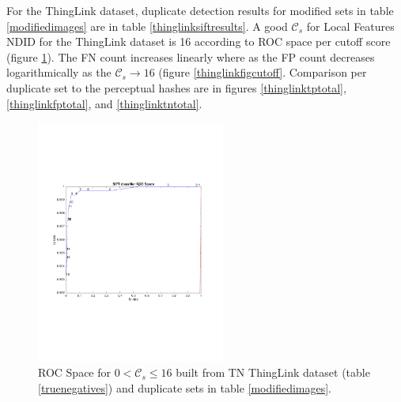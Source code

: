 \documentclass[english,12pt,a4paper,pdftex,elec,utf8]{aaltothesis}
\begin{document}
\clearpage

For the ThingLink dataset, duplicate detection results for modified sets in table \ref{modifiedimages} are in table \ref{thinglinksiftresults}. A good $\mathcal{C}_s$ for Local Features NDID for the ThingLink dataset is 16 according to ROC space per cutoff score (figure \ref{thinglinkfigcutoffrocspace}). The FN count increases linearly where as the FP count decreases logarithmically as the $\mathcal{C}_s \rightarrow 16$ (figure \ref{thinglinkfigcutoff}. Comparison per duplicate set to the perceptual hashes are in figures \ref{thinglinktptotal}, \ref{thinglinkfptotal}, and \ref{thinglinktntotal}.

\begin{figure}[htb]
\begin{center}
\includegraphics[height=8cm]{figures/thinglink_SIFTROCperCutoff}
\end{center}
\caption{ ROC Space for $0 < \mathcal{C}_{s} \leq 16$ built from TN ThingLink dataset (table \ref{truenegatives}) and duplicate sets in table \ref{modifiedimages}.}
\label{thinglinkfigcutoffrocspace}
\end{figure}
\end{document}
